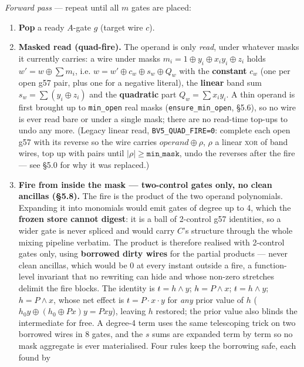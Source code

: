 \documentclass[11pt]{article}
\newcommand{\g}{\textsf{g57}}
\newcommand{\doc}[1]{\texttt{#1}}
\newcommand{\xor}{\oplus}
\begin{document}
\emph{Forward pass} --- repeat until all $m$ gates are placed:
\begin{enumerate}
\item \textbf{Pop} a ready $A$-gate $g$ (target wire $c$).
\item \textbf{Masked read (quad-fire).} The operand is only \emph{read}, under
  whatever masks it currently carries: a wire under masks
  $m_i = 1 \xor y_i \xor x_i y_i \xor z_i$ holds $w' = w \xor \sum m_i$, i.e.
  $w = w' \xor c_w \xor s_w \xor Q_w$ with the \textbf{constant} $c_w$ (one per open
  \g{} pair, plus one for a negative literal), the \textbf{linear} band sum
  $s_w = \sum (y_i \xor z_i)$ and the \textbf{quadratic} part $Q_w = \sum x_i y_i$. A
  thin operand is first brought up to \doc{min\_open} real masks
  (\doc{ensure\_min\_open}, \S5.6), so no wire is ever read bare or under a single
  mask; there are no read-time top-ups to undo any more. (Legacy linear
  read, \doc{BV5\_QUAD\_FIRE=0}: complete each open \g{} with its reverse so the wire
  carries $\mathit{operand} \xor \rho$, $\rho$ a linear \textsc{xor} of band wires,
  top up with pairs until $|\rho| \ge \doc{min\_mask}$, undo the reverses after the
  fire --- see \S5.0 for why it was replaced.)
\item \textbf{Fire from inside the mask --- two-control gates only, no clean
  ancillas (\S5.8).} The fire is the product of the two operand polynomials.
  Expanding it into monomials would emit gates of degree up to 4, which the
  \textbf{frozen store cannot digest}: it is a ball of 2-control \g{} identities, so a
  wider gate is never spliced and would carry $C$'s structure through the whole mixing
  pipeline verbatim. The product is therefore realised with 2-control gates only, using
  \textbf{borrowed dirty wires} for the partial products --- never clean ancillas, which
  would be 0 at every instant outside a fire, a function-level invariant that no
  rewriting can hide and whose non-zero stretches delimit the fire blocks. The identity is
  $t \mathrel{\hat{}}= h{\wedge}y$; $h \mathrel{\hat{}}= P{\wedge}x$;
  $t \mathrel{\hat{}}= h{\wedge}y$; $h \mathrel{\hat{}}= P{\wedge}x$, whose net effect is
  $t \mathrel{\hat{}}= P{\cdot}x{\cdot}y$ for \emph{any} prior value of $h$
  ($h_0 y \xor (h_0{\xor}Px)y = Pxy$), leaving $h$ restored; the prior value also blinds
  the intermediate for free. A degree-4 term uses the same telescoping trick on two
  borrowed wires in 8 gates, and the $s$ sums are expanded term by term so no mask
  aggregate is ever materialised. Four rules keep the borrowing safe, each found by

\end{enumerate}
\end{document}

